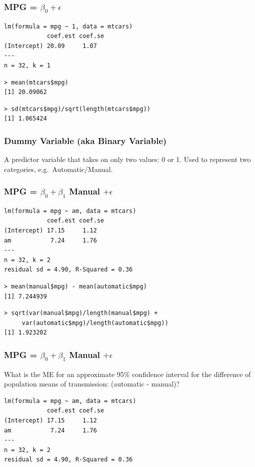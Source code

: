 \documentclass{beamer}
\begin{document}
\begin{frame}[fragile]
\frametitle{MPG = $\beta_0 +  \epsilon$}
\footnotesize
\begin{verbatim}
lm(formula = mpg ~ 1, data = mtcars)
            coef.est coef.se
(Intercept) 20.09     1.07  
---
n = 32, k = 1
\end{verbatim}
\pause
\begin{verbatim}
> mean(mtcars$mpg)
[1] 20.09062
\end{verbatim}
\pause
\begin{verbatim}
> sd(mtcars$mpg)/sqrt(length(mtcars$mpg))
[1] 1.065424
\end{verbatim}
\end{frame}

\begin{frame}
\frametitle{Dummy Variable (aka Binary Variable)}
 
A predictor variable that takes on only two values: 0 or 1. Used to represent two categories, e.g.\ Automatic/Manual.
\end{frame}



\begin{frame}[fragile]
\frametitle{MPG = $\beta_0 + \beta_1$ Manual $+ \epsilon$}

\footnotesize
\begin{verbatim}
lm(formula = mpg ~ am, data = mtcars)
            coef.est coef.se
(Intercept) 17.15     1.12  
am           7.24     1.76  
---
n = 32, k = 2
residual sd = 4.90, R-Squared = 0.36
\end{verbatim}
\pause
\begin{verbatim}
> mean(manual$mpg) - mean(automatic$mpg)
[1] 7.244939
\end{verbatim}
\pause
\begin{verbatim}
> sqrt(var(manual$mpg)/length(manual$mpg) + 
     var(automatic$mpg)/length(automatic$mpg))
[1] 1.923202
\end{verbatim}
\end{frame}




\begin{frame}[fragile]
\frametitle{MPG = $\beta_0 + \beta_1$ Manual $+ \epsilon$ }

\alert{What is the ME for an approximate 95\% confidence interval for the difference of population means of transmission: (automatic - manual)?}

\footnotesize
\begin{verbatim}
lm(formula = mpg ~ am, data = mtcars)
            coef.est coef.se
(Intercept) 17.15     1.12  
am           7.24     1.76  
---
n = 32, k = 2
residual sd = 4.90, R-Squared = 0.36
\end{verbatim}

\end{frame}
\end{document}
